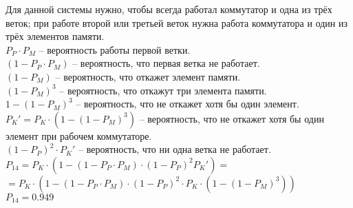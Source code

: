 \documentclass[12pt, a4paper] {ncc}
\begin{document}
		Для данной системы нужно, чтобы всегда работал коммутатор и
   	    одна из трёх веток; при работе второй или третьей веток нужна
   	    работа коммутатора и один из трёх элементов памяти.\\
  	    $P_P \cdot P_M$ -- вероятность работы первой ветки.\\
   	    $(1 - P_P \cdot P_M)$ -- вероятность, что первая ветка не работает.\\
   	    $(1 - P_M)$ -- вероятность, что откажет элемент памяти.\\
   	    $(1 - P_M)^3$ -- вероятность, что откажут три элемента памяти.\\
   	    $1 - (1 - P_M)^3$ -- вероятность, что не откажет хотя бы один элемент.\\
   	    $P_K' = P_K \cdot (1 - (1 - P_M)^3)$ -- вероятность, что не откажет хотя бы один элемент при рабочем коммутаторе.\\
   	    $(1 - P_P)^2 \cdot P_K'$ -- вероятность, что ни одна ветка не работает.\\
		$P_{14} = P_K \cdot (1 - (1 - P_P \cdot P_M) \cdot (1 - P_P)^2 P_K') = $\\
		$= P_K \cdot (1 - (1 - P_P \cdot P_M) \cdot (1 - P_P)^2 \cdot P_K \cdot (1 - (1 - P_M)^3))$ \\
		$P_{14} = 0.949$
\end{document}
